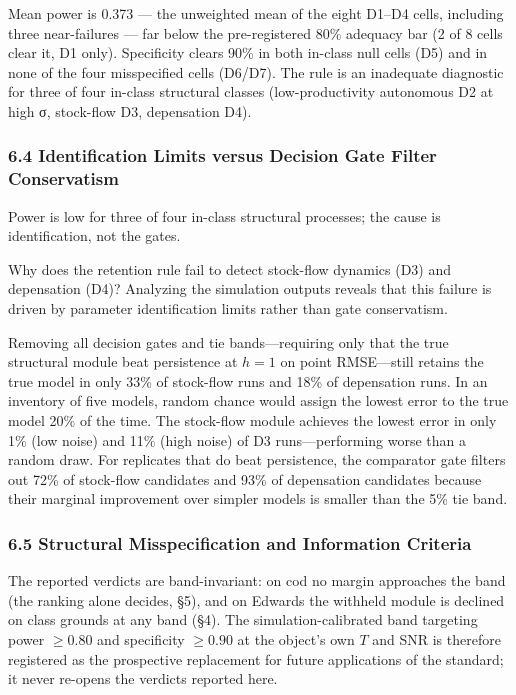 \documentclass[11pt]{article}
\begin{document}
Mean power is 0.373 --- the unweighted mean of the eight D1--D4 cells,
including three near-failures --- far below the pre-registered 80\%
adequacy bar (2 of 8 cells clear it, D1 only). Specificity clears 90\%
in both in-class null cells (D5) and in none of the four misspecified
cells (D6/D7). The rule is an inadequate diagnostic for three of four
in-class structural classes (low-productivity autonomous D2 at high σ,
stock-flow D3, depensation D4).

\subsubsection{6.4 Identification Limits versus Decision Gate Filter
Conservatism}\label{identification-limits-versus-decision-gate-filter-conservatism}

Power is low for three of four in-class structural processes; the cause
is identification, not the gates.

Why does the retention rule fail to detect stock-flow dynamics (D3) and
depensation (D4)? Analyzing the simulation outputs reveals that this
failure is driven by parameter identification limits rather than gate
conservatism.

Removing all decision gates and tie bands---requiring only that the true
structural module beat persistence at \(h = 1\) on point RMSE---still
retains the true model in only 33\% of stock-flow runs and 18\% of
depensation runs. In an inventory of five models, random chance would
assign the lowest error to the true model 20\% of the time. The
stock-flow module achieves the lowest error in only 1\% (low noise) and
11\% (high noise) of D3 runs---performing worse than a random draw. For
replicates that do beat persistence, the comparator gate filters out
72\% of stock-flow candidates and 93\% of depensation candidates because
their marginal improvement over simpler models is smaller than the 5\%
tie band.

\subsubsection{6.5 Structural Misspecification and Information
Criteria}\label{structural-misspecification-and-information-criteria}

The reported verdicts are band-invariant: on cod no margin approaches
the band (the ranking alone decides, §5), and on Edwards the withheld
module is declined on class grounds at any band (§4). The
simulation-calibrated band targeting power \(\ge 0.80\) and specificity
\(\ge 0.90\) at the object's own \(T\) and SNR is therefore registered
as the prospective replacement for future applications of the standard;
it never re-opens the verdicts reported here.
\end{document}
